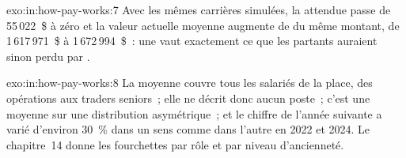 \begin{solution}{exo:in:how-pay-works:7}
Avec les mêmes carrières simulées, la  attendue passe de 55\,022~\$ à zéro et la valeur actuelle moyenne augmente de
du même montant, de 1\,617\,971~\$ à 1\,672\,994~\$~: une  vaut exactement ce que les partants auraient
sinon perdu par .
\end{solution}

\begin{solution}{exo:in:how-pay-works:8}
La moyenne couvre tous les salariés de la place, des opérations aux traders seniors~; elle ne décrit donc aucun poste~;
c'est une moyenne sur une distribution asymétrique~; et le chiffre de l'année suivante a varié d'environ 30~\% dans un sens comme dans l'autre en 2022 et 2024. Le chapitre~14 donne les fourchettes par rôle et
par niveau d'ancienneté.
\end{solution}


